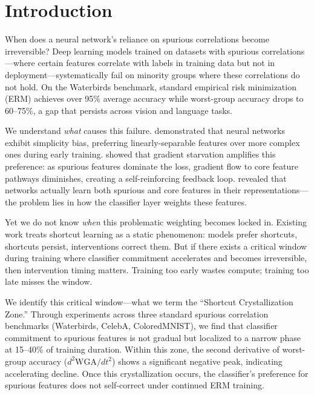 \section{Introduction}

When does a neural network's reliance on spurious correlations become irreversible? Deep learning models trained on datasets with spurious correlations---where certain features correlate with labels in training data but not in deployment---systematically fail on minority groups where these correlations do not hold. On the Waterbirds benchmark, standard empirical risk minimization (ERM) achieves over 95\% average accuracy while worst-group accuracy drops to 60--75\%, a gap that persists across vision and language tasks.

We understand \emph{what} causes this failure. \citet{shah2020simplicity} demonstrated that neural networks exhibit simplicity bias, preferring linearly-separable features over more complex ones during early training. \citet{pezeshki2021gradient} showed that gradient starvation amplifies this preference: as spurious features dominate the loss, gradient flow to core feature pathways diminishes, creating a self-reinforcing feedback loop. \citet{kirichenko2023last} revealed that networks actually learn both spurious and core features in their representations---the problem lies in how the classifier layer weights these features.

Yet we do not know \emph{when} this problematic weighting becomes locked in. Existing work treats shortcut learning as a static phenomenon: models prefer shortcuts, shortcuts persist, interventions correct them. But if there exists a critical window during training where classifier commitment accelerates and becomes irreversible, then intervention timing matters. Training too early wastes compute; training too late misses the window.

We identify this critical window---what we term the ``Shortcut Crystallization Zone.'' Through experiments across three standard spurious correlation benchmarks (Waterbirds, CelebA, ColoredMNIST), we find that classifier commitment to spurious features is not gradual but localized to a narrow phase at 15--40\% of training duration. Within this zone, the second derivative of worst-group accuracy ($d^2\text{WGA}/dt^2$) shows a significant negative peak, indicating accelerating decline. Once this crystallization occurs, the classifier's preference for spurious features does not self-correct under continued ERM training.

